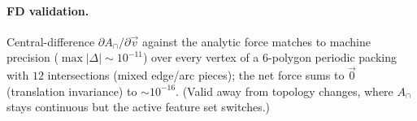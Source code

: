 \documentclass[11pt]{article}
\newcommand{\vv}[1]{\vec{#1}}
\begin{document}
\paragraph{FD validation.} Central-difference $\partial A_{\cap}/\partial\vv v$ against the analytic
force matches to machine precision ($\max|\Delta|\sim10^{-11}$) over every vertex of a $6$-polygon
periodic packing with $12$ intersections (mixed edge/arc pieces); the net force sums to $\vv0$
(translation invariance) to $\sim10^{-16}$. (Valid away from topology changes, where $A_{\cap}$ stays
continuous but the active feature set switches.)
\end{document}
